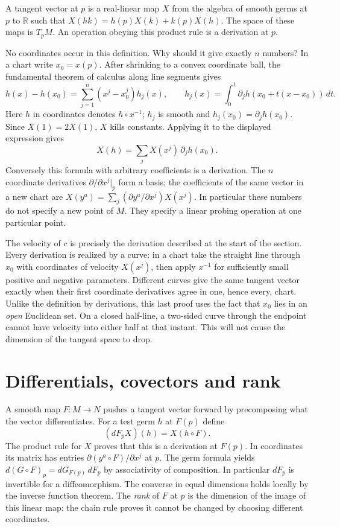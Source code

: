 \begin{definition}
A tangent vector at $p$ is a real-linear map $X$ from the algebra of smooth germs at $p$ to $\mathbb R$ such that $X(hk)=h(p)X(k)+k(p)X(h)$. The space of these maps is $T_pM$. An operation obeying this product rule is a derivation at $p$.
\end{definition}
No coordinates occur in this definition. Why should it give exactly $n$ numbers? In a chart write $x_0=x(p)$. After shrinking to a convex coordinate ball, the fundamental theorem of calculus along line segments gives
\[
 h(x)-h(x_0)=\sum_{j=1}^n(x^j-x_0^j)h_j(x),\qquad
 h_j(x)=\int_0^1\partial_j h(x_0+t(x-x_0))\,dt .
\]
Here $h$ in coordinates denotes $h\circ x^{-1}$; $h_j$ is smooth and $h_j(x_0)=\partial_j h(x_0)$. Since $X(1)=2X(1)$, $X$ kills constants. Applying it to the displayed expression gives
\begin{equation}
 X(h)=\sum_j X(x^j)\,\partial_j h(x_0).\label{f:tangent-coords}
\end{equation}
Conversely this formula with arbitrary coefficients is a derivation. The $n$ coordinate derivatives $\partial/\partial x^j|_p$ form a basis; the coefficients of the same vector in a new chart are $X(y^a)=\sum_j(\partial y^a/\partial x^j)X(x^j)$. In particular these numbers do not specify a new point of $M$. They specify a linear probing operation at one particular point.

The velocity of $c$ is precisely the derivation described at the start of the section. Every derivation is realized by a curve: in a chart take the straight line through $x_0$ with coordinates of velocity $X(x^j)$, then apply $x^{-1}$ for sufficiently small positive and negative parameters. Different curves give the same tangent vector exactly when their first coordinate derivatives agree in one, hence every, chart. Unlike the definition by derivations, this last proof uses the fact that $x_0$ lies in an \emph{open} Euclidean set. On a closed half-line, a two-sided curve through the endpoint cannot have velocity into either half at that instant. This will not cause the dimension of the tangent space to drop.

\section{Differentials, covectors and rank}
A smooth map $F:M\to N$ pushes a tangent vector forward by precomposing what the vector differentiates. For a test germ $h$ at $F(p)$ define
\[
 (dF_p X)(h)=X(h\circ F).
\]
The product rule for $X$ proves that this is a derivation at $F(p)$. In coordinates its matrix has entries $\partial (y^a\circ F)/\partial x^j$ at $p$. The germ formula yields $d(G\circ F)_p=dG_{F(p)}\,dF_p$ by associativity of composition. In particular $dF_p$ is invertible for a diffeomorphism. The converse in equal dimensions holds locally by the inverse function theorem. The \emph{rank} of $F$ at $p$ is the dimension of the image of this linear map: the chain rule proves it cannot be changed by choosing different coordinates.

